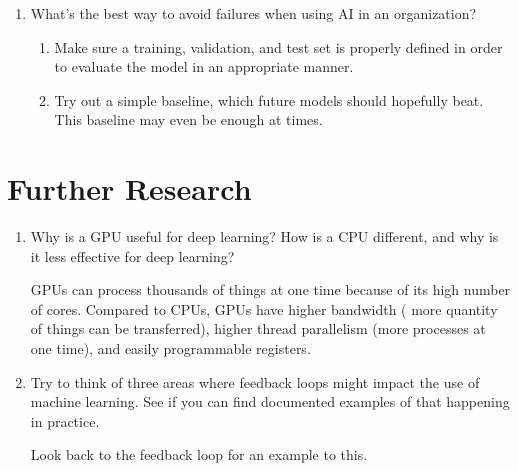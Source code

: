 \documentclass[12pt,a4paper]{article}
\begin{document}
\begin{enumerate}
\item What's the best way to avoid failures when using AI in an organization? \\

\begin{enumerate}
\item Make sure a training, validation, and test set is properly defined in order to evaluate the model in an appropriate manner. \\
\item Try out a simple baseline, which future models should hopefully beat. This baseline may even be enough at times. \\
\end{enumerate}

\end{enumerate}

\section*{Further Research}

\begin{enumerate}

\item Why is a GPU useful for deep learning? How is a CPU different, and why is it less effective for deep learning? \\

\smallbreak

GPUs can process thousands of things at one time because of its high number of cores. Compared to CPUs, GPUs have higher bandwidth ( more quantity of things can be transferred), higher thread parallelism (more processes at one time), and easily programmable registers.

\bigbreak

\item Try to think of three areas where feedback loops might impact the use of machine learning. See if you can find documented examples of that happening in practice.

\smallbreak

Look back to the feedback loop for an example to this.
\end{enumerate}
\end{document}

